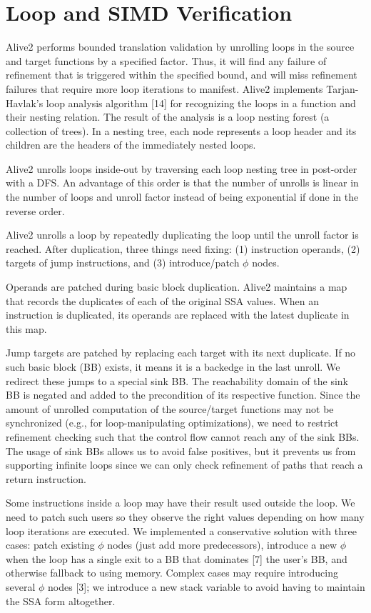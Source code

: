 \chapter{Loop and SIMD Verification}


Alive2 performs bounded translation validation by unrolling loops in
the source and target functions by a specified factor. Thus, it will
find any failure of refinement that is triggered within the specified
bound, and will miss refinement failures that require more loop
iterations to manifest. Alive2 implements Tarjan-Havlak’s loop
analysis algorithm [14] for recognizing the loops in a function and
their nesting relation. The result of the analysis is a loop nesting
forest (a collection of trees). In a nesting tree, each node
represents a loop header and its children are the headers of the
immediately nested loops.

Alive2 unrolls loops inside-out by traversing each loop nesting tree
in post-order with a DFS. An advantage of this order is that the
number of unrolls is linear in the number of loops and unroll factor
instead of being exponential if done in the reverse order.

Alive2 unrolls a loop by repeatedly duplicating the loop until the
unroll factor is reached. After duplication, three things need fixing:
(1) instruction operands, (2) targets of jump instructions, and (3)
introduce/patch $\phi$ nodes.

Operands are patched during basic block duplication. Alive2 maintains
a map that records the duplicates of each of the original SSA values.
When an instruction is duplicated, its operands are replaced with the
latest duplicate in this map.

Jump targets are patched by replacing each target with its next
duplicate. If no such basic block (BB) exists, it means it is a
backedge in the last unroll. We redirect these jumps to a special sink
BB. The reachability domain of the sink BB is negated and added to the
precondition of its respective function. Since the amount of unrolled
computation of the source/target functions may not be synchronized
(e.g., for loop-manipulating optimizations), we need to restrict
refinement checking such that the control flow cannot reach any of the
sink BBs. The usage of sink BBs allows us to avoid false positives,
but it prevents us from supporting infinite loops since we can only
check refinement of paths that reach a return instruction.

Some instructions inside a loop may have their result used outside the
loop. We need to patch such users so they observe the right values
depending on how many loop iterations are executed. We implemented a
conservative solution with three cases: patch existing $\phi$ nodes
(just add more predecessors), introduce a new $\phi$ when the loop has
a single exit to a BB that dominates [7] the user’s BB, and otherwise
fallback to using memory. Complex cases may require introducing
several $\phi$ nodes [3]; we introduce a new stack variable to avoid
having to maintain the SSA form altogether.



